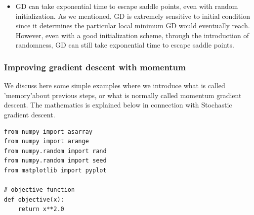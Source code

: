 \documentclass{beamer}
\begin{document}
\begin{frame}
\begin{itemize}
\item GD can take exponential time to escape saddle points, even with random initialization. As we mentioned, GD is extremely sensitive to initial condition since it determines the particular local minimum GD would eventually reach. However, even with a good initialization scheme, through the introduction of randomness, GD can still take exponential time to escape saddle points.
\end{itemize}

\noindent
\end{frame}

\begin{frame}
\frametitle{Improving gradient descent with momentum}

We discuss here some simple examples where we introduce what is called 'memory'about previous steps, or what is normally called momentum gradient descent. The mathematics is explained below in connection with Stochastic gradient descent.


























































\begin{verbatim}
from numpy import asarray
from numpy import arange
from numpy.random import rand
from numpy.random import seed
from matplotlib import pyplot
 
# objective function
def objective(x):
	return x**2.0
 

\end{verbatim}
\end{frame}
\end{document}

